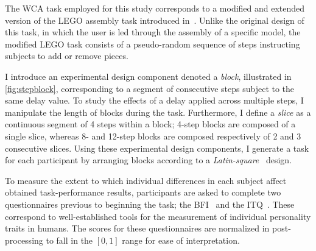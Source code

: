 \medskip
The \gls{WCA} task employed for this study corresponds to a modified and extended version of the LEGO assembly task introduced in~\cite{chen2015early}.
Unlike the original design of this task, in which the user is led through the assembly of a specific model, the modified LEGO task consists of a pseudo-random sequence of steps instructing subjects to add or remove pieces.

I introduce an experimental design component denoted a \emph{block}, illustrated in \cref{fig:stepblock}, corresponding to a segment of consecutive steps subject to the same delay value.
To study the effects of a delay applied across multiple steps, I manipulate the length of blocks during the task. %
Furthermore, I define a \emph{slice} as a continuous segment of \num{4} steps within a block;
\num{4}-step blocks are composed of a single slice, whereas \num{8}- and \num{12}-step blocks are composed respectively of \num{2} and \num{3} consecutive slices.
Using these experimental design components, I generate a task for each participant by arranging blocks according to a \emph{Latin-square}~\cite{keedwell2015latin} design.

To measure the extent to which individual differences in each subject affect obtained task-performance results, participants are asked to complete two questionnaires previous to beginning the task;
the \gls{BFI}~\cite{john1999big} and the \gls{ITQ}~\cite{witmer1998measuring}.
These correspond to well-established tools for the measurement of individual personality traits in humans.
The scores for these questionnaires are normalized in post-processing to fall in the \ensuremath{[0, 1]} range for ease of interpretation.


